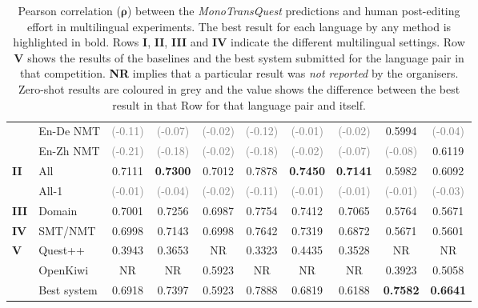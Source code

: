 \begin{table}[t]
\begin{center}
{\begin{tabular}{l l c c c c c c c c}
				& En-De NMT & \textcolor{gray}{(-0.11)} &  \textcolor{gray}{(-0.07)} & \textcolor{gray}{(-0.02)} & \textcolor{gray}{(-0.12)} & \textcolor{gray}{(-0.01)}  & \textcolor{gray}{(-0.02)} & 0.5994 &  \textcolor{gray}{(-0.04)} \\
				& En-Zh NMT & \textcolor{gray}{(-0.21)} &  \textcolor{gray}{(-0.18)} & \textcolor{gray}{(-0.02)} & \textcolor{gray}{(-0.18)} & \textcolor{gray}{(-0.02)}  & \textcolor{gray}{(-0.07)} & \textcolor{gray}{(-0.08)} & 0.6119 \\
				\midrule
				\multirow{2}{*}{\bf II} & All & 0.7111 &  \textbf{0.7300} & 0.7012 & 0.7878 & \textbf{0.7450} & \textbf{0.7141} & 0.5982 & 0.6092\\
				& All-1 & \textcolor{gray}{(-0.01)} &  \textcolor{gray}{(-0.04)} & \textcolor{gray}{(-0.02)} & \textcolor{gray}{(-0.11)} & \textcolor{gray}{(-0.01)} & \textcolor{gray}{(-0.01)} & \textcolor{gray}{(-0.01)} & \textcolor{gray}{(-0.03)} \\
				\midrule
				\multirow{1}{*}{\bf III} & Domain & 0.7001 &  0.7256 & 0.6987 & 0.7754 & 0.7412 & 0.7065  & 0.5764 &  0.5671 \\
				\midrule
				\multirow{1}{*}{\bf IV} & SMT/NMT & 0.6998 &  0.7143 & 0.6998 & 0.7642 & 0.7319 & 0.6872 & 0.5671 & 0.5601 \\
				\midrule
				\multirow{3}{*}{\bf V} & Quest++ & 0.3943 &  0.3653 & NR & 0.3323 & 0.4435 & 0.3528 & NR & NR \\
				& OpenKiwi & NR &  NR & 0.5923 & NR & NR & NR & 0.3923 & 0.5058 \\
				& Best system & 0.6918 &  0.7397 & 0.5923 & 0.7888 & 0.6819 & 0.6188 & \textbf{0.7582} & \textbf{0.6641} \\
				\bottomrule
			\end{tabular}
		}
	\end{center}
\caption[Pearson correlation between the MonoTransQuest predictions and human post-editing effort in multilingual experiments]{Pearson correlation ($\bm{\rho}$) between the \textit{MonoTransQuest} predictions and human post-editing effort in multilingual experiments. The best result for each language by any method is highlighted in bold. Rows \textbf{I}, \textbf{II}, \textbf{III} and \textbf{IV} indicate the different multilingual settings. Row \textbf{V} shows the results of the baselines and the best system submitted for the language pair in that competition. \textbf{NR} implies that a particular result was \textit{not reported} by the organisers. Zero-shot results are coloured in grey and the value shows the difference between the best result in that Row for that language pair and itself.} 
	\label{tab:multilingual_hter}
\end{table}


